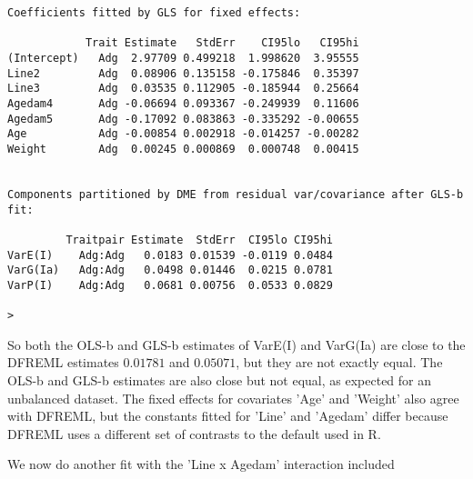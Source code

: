\documentclass[titlepage]{article}  %
\begin{document}
\begin{verbatim}
Coefficients fitted by GLS for fixed effects:

            Trait Estimate   StdErr    CI95lo   CI95hi
(Intercept)   Adg  2.97709 0.499218  1.998620  3.95555
Line2         Adg  0.08906 0.135158 -0.175846  0.35397
Line3         Adg  0.03535 0.112905 -0.185944  0.25664
Agedam4       Adg -0.06694 0.093367 -0.249939  0.11606
Agedam5       Adg -0.17092 0.083863 -0.335292 -0.00655
Age           Adg -0.00854 0.002918 -0.014257 -0.00282
Weight        Adg  0.00245 0.000869  0.000748  0.00415


Components partitioned by DME from residual var/covariance after GLS-b fit:

         Traitpair Estimate  StdErr  CI95lo CI95hi
VarE(I)    Adg:Adg   0.0183 0.01539 -0.0119 0.0484
VarG(Ia)   Adg:Adg   0.0498 0.01446  0.0215 0.0781
VarP(I)    Adg:Adg   0.0681 0.00756  0.0533 0.0829

> 
\end{verbatim}

So both the OLS-b and GLS-b estimates of VarE(I) and VarG(Ia) are close to the DFREML estimates $0.01781$ and $0.05071$, but they are not exactly equal. The OLS-b and GLS-b estimates are also close but not equal, as expected for an unbalanced dataset. The fixed effects for covariates 'Age' and 'Weight' also agree with DFREML, but the constants fitted for 'Line' and 'Agedam' differ because DFREML uses a different set of contrasts to the default used in R.

We now do another fit with the 'Line x Agedam' interaction included
\end{document}
